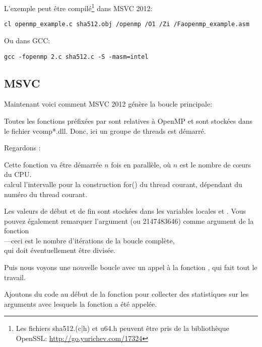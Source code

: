 L'exemple peut être compilé\footnote{Les fichiers sha512.(c|h) et u64.h peuvent être
pris de la bibliothèque OpenSSL:
\url{http://go.yurichev.com/17324}}
dans MSVC 2012:

\begin{lstlisting}
cl openmp_example.c sha512.obj /openmp /O1 /Zi /Faopenmp_example.asm
\end{lstlisting}

Ou dans GCC:

\begin{lstlisting}
gcc -fopenmp 2.c sha512.c -S -masm=intel
\end{lstlisting}

\subsection{MSVC}

Maintenant voici comment MSVC 2012 génère la boucle principale:



Toutes les fonctions préfixées par  sont relatives à OpenMP et sont stockées
dans le fichier vcomp*.dll.
Donc, ici un groupe de threads est démarré.

Regardons :



Cette fonction va être démarrée $n$ fois en parallèle, où $n$ est le nombre de c\oe{}urs
du \ac{CPU}.\\
calcul l'intervalle pour la construction for() du thread courant, dépendant du numéro
du thread courant.

Les valeurs de début et de fin sont stockées dans les variables locales 
et .
Vous pouvez également remarquer l'argument  (ou 2147483646) comme argument
de la fonction\\
---ceci est le nombre d'itérations
de la boucle complète,\\
 qui doit éventuellement être divisée.

Puis nous voyons une nouvelle boucle avec un appel à la fonction ,
qui fait tout le travail.

Ajoutons du code au début de la fonction  pour collecter des statistiques
sur les arguments avec lesquels la fonction a été appelée.

